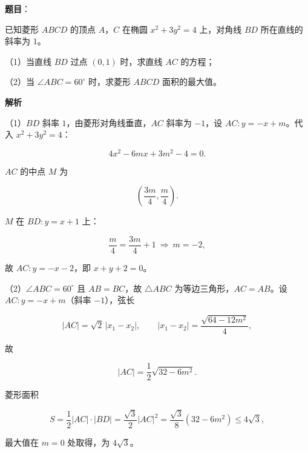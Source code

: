 \begin{answer}

\textbf{题目}：

已知菱形 $ABCD$ 的顶点 $A$，$C$ 在椭圆 $x^2+3y^2=4$ 上，对角线 $BD$ 所在直线的斜率为 $1$。

（1）当直线 $BD$ 过点 $(0,1)$ 时，求直线 $AC$ 的方程；

（2）当 $\angle ABC=60^\circ$ 时，求菱形 $ABCD$ 面积的最大值。

\textbf{解析}

（1）$BD$ 斜率 $1$，由菱形对角线垂直，$AC$ 斜率为 $-1$，设 $AC:y=-x+m$。代入 $x^2+3y^2=4$：

\nopagebreak[4]
\[4x^2-6mx+3m^2-4=0.\]

$AC$ 的中点 $M$ 为

\nopagebreak[4]
\[\left(\frac{3m}4,\frac m4\right).\]

$M$ 在 $BD:y=x+1$ 上：

\nopagebreak[4]
\[\frac m4=\frac{3m}4+1\ \Longrightarrow\ m=-2,\]

故 $AC:y=-x-2$，即 $x+y+2=0$。

（2）$\angle ABC=60^\circ$ 且 $AB=BC$，故 $\triangle ABC$ 为等边三角形，$AC=AB$。设 $AC:y=-x+m$（斜率 $-1$），弦长

\nopagebreak[4]
\[|AC|=\sqrt2\,|x_1-x_2|,\qquad |x_1-x_2|=\frac{\sqrt{64-12m^2}}4,\]

故

\nopagebreak[4]
\[|AC|=\frac12\sqrt{32-6m^2}.\]

菱形面积

\nopagebreak[4]
\[S=\frac12|AC|\cdot|BD|=\frac{\sqrt3}2|AC|^2=\frac{\sqrt3}8(32-6m^2)\leqslant4\sqrt3,\]

最大值在 $m=0$ 处取得，为 $4\sqrt3$。


\end{answer}
